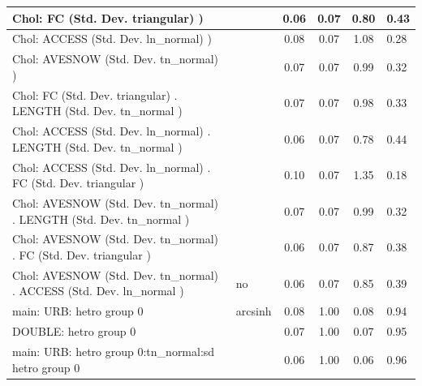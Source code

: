 \begin{table}
\begin{center}
\begin{tabular}{|l|l|c|c|c|l|}
			 Chol: FC (Std. Dev. triangular) ) &  & 0.06 & 0.07 & 0.80 & 0.43 \\
			\hline
			 Chol: ACCESS (Std. Dev. ln_normal) ) &  & 0.08 & 0.07 & 1.08 & 0.28 \\
			\hline
			 Chol: AVESNOW (Std. Dev. tn_normal) ) &  & 0.07 & 0.07 & 0.99 & 0.32 \\
			\hline
			 Chol: FC (Std. Dev. triangular) . LENGTH (Std. Dev.   tn_normal ) &  & 0.07 & 0.07 & 0.98 & 0.33 \\
			\hline
			 Chol: ACCESS (Std. Dev. ln_normal) . LENGTH (Std. Dev.   tn_normal ) &  & 0.06 & 0.07 & 0.78 & 0.44 \\
			\hline
			 Chol: ACCESS (Std. Dev. ln_normal) . FC (Std. Dev.   triangular ) &  & 0.10 & 0.07 & 1.35 & 0.18 \\
			\hline
			 Chol: AVESNOW (Std. Dev. tn_normal) . LENGTH (Std. Dev.   tn_normal ) &  & 0.07 & 0.07 & 0.99 & 0.32 \\
			\hline
			 Chol: AVESNOW (Std. Dev. tn_normal) . FC (Std. Dev.   triangular ) &  & 0.06 & 0.07 & 0.87 & 0.38 \\
			\hline
			 Chol: AVESNOW (Std. Dev. tn_normal) . ACCESS (Std. Dev.   ln_normal ) & no & 0.06 & 0.07 & 0.85 & 0.39 \\
			\hline
			main: URB: hetro group 0 & arcsinh & 0.08 & 1.00 & 0.08 & 0.94 \\
			\hline
			DOUBLE: hetro group 0 &  & 0.07 & 1.00 & 0.07 & 0.95 \\
			\hline
			main: URB: hetro group 0:tn_normal:sd  hetro group 0 &  & 0.06 & 1.00 & 0.06 & 0.96 \\
			\hline
		\end{tabular}
	\end{center}
\end{table}